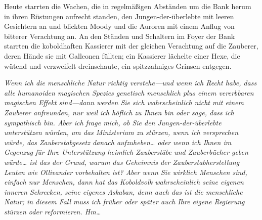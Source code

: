 Heute starrten die Wachen, die in regelmäßigen Abständen um die Bank herum in ihren Rüstungen aufrecht standen, den Jungen-der-überlebte mit leeren Gesichtern an und blickten Moody und die Auroren mit einem Anflug von bitterer Verachtung an. An den Ständen und Schaltern im Foyer der Bank starrten die koboldhaften Kassierer mit der gleichen Verachtung auf die Zauberer, deren Hände sie mit Galleonen füllten; ein Kassierer lächelte einer Hexe, die wütend und verzweifelt dreinschaute, ein spitzzahniges Grinsen entgegen.

\emph{Wenn ich die menschliche Natur richtig verstehe—und wenn ich Recht habe, dass alle humanoiden magischen Spezies genetisch menschlich plus einem vererbbaren magischen Effekt sind—dann werden Sie sich wahrscheinlich nicht mit einem Zauberer anfreunden, nur weil ich höflich zu Ihnen bin oder sage, dass ich sympathisch bin. Aber ich frage mich, ob Sie den Jungen-der-überlebte unterstützen würden, um das Ministerium zu stürzen, wenn ich versprechen würde, das Zauberstabgesetz danach aufzuheben… oder wenn ich Ihnen im Gegenzug für Ihre Unterstützung heimlich Zauberstäbe und Zauberbücher geben würde… ist das der Grund, warum das Geheimnis der Zauberstabherstellung Leuten wie Ollivander vorbehalten ist? Aber wenn Sie wirklich Menschen sind, einfach nur Menschen, dann hat das Koboldvolk wahrscheinlich seine eigenen inneren Schrecken, seine eigenes Askaban, denn auch das ist die menschliche Natur; in diesem Fall muss ich früher oder später auch Ihre eigene Regierung stürzen oder reformieren. Hm…}

